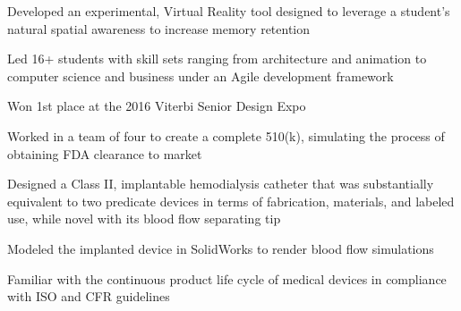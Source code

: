 \documentclass[letterpaper]{deedy-resume} %
\begin{document}
\begin{minipage}[t]{0.66\textwidth}
\sectionspace %




\vspace{\topsep} %

\begin{tightitemize}
\item Developed an experimental, Virtual Reality tool designed to leverage a student’s natural spatial awareness to increase memory retention
\item Led 16+ students with skill sets ranging from architecture and animation to computer science and business under an Agile development framework
\item Won 1st place at the 2016 Viterbi Senior Design Expo 
\end{tightitemize}

\sectionspace



\vspace{\topsep} %

\begin{tightitemize}
\item Worked in a team of four to create a complete 510(k), simulating the process of obtaining FDA clearance to market
\item Designed a Class II, implantable hemodialysis catheter that was substantially equivalent to two predicate devices in terms of fabrication, materials, and labeled use, while novel with its blood flow separating tip 
\item Modeled the implanted device in SolidWorks to render blood flow simulations 
\item Familiar with the continuous product life cycle of medical devices in compliance with ISO and CFR guidelines 
\end{tightitemize}

\sectionspace 


\end{minipage}
\end{document}
